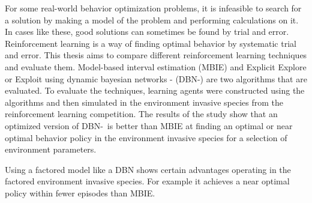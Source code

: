 
For some real-world behavior optimization problems, it is infeasible to search for a solution by making a model of the problem and performing calculations on it. 
In cases like these, good solutions can sometimes be found by trial and error. 
Reinforcement learning is a way of finding optimal behavior by systematic trial and error.
This thesis aims to compare different reinforcement learning techniques and evaluate them. 
Model-based interval estimation (MBIE) and Explicit Explore or Exploit using dynamic bayesian networks - (DBN-\etre)
 are two algorithms that are evaluated. 
To evaluate the techniques, learning agents were constructed using the algorithms and 
then simulated in the environment invasive species from the reinforcement learning competition.
The results of the study show that an optimized version of DBN-\etre\ is better than MBIE at finding an optimal or near optimal behavior policy in the 
environment invasive species for a selection of environment parameters.

Using a factored model like a DBN shows certain advantages operating in 
the factored environment invasive species. For example it achieves a near optimal
policy within fewer episodes than MBIE.






